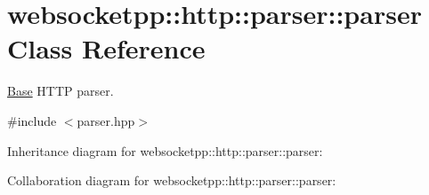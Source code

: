 \hypertarget{classwebsocketpp_1_1http_1_1parser_1_1parser}{}\section{websocketpp\+:\+:http\+:\+:parser\+:\+:parser Class Reference}
\label{classwebsocketpp_1_1http_1_1parser_1_1parser}


\mbox{\hyperlink{struct_base}{Base}} H\+T\+TP parser.  




{\ttfamily \#include $<$parser.\+hpp$>$}



Inheritance diagram for websocketpp\+:\+:http\+:\+:parser\+:\+:parser\+:


Collaboration diagram for websocketpp\+:\+:http\+:\+:parser\+:\+:parser\+:
